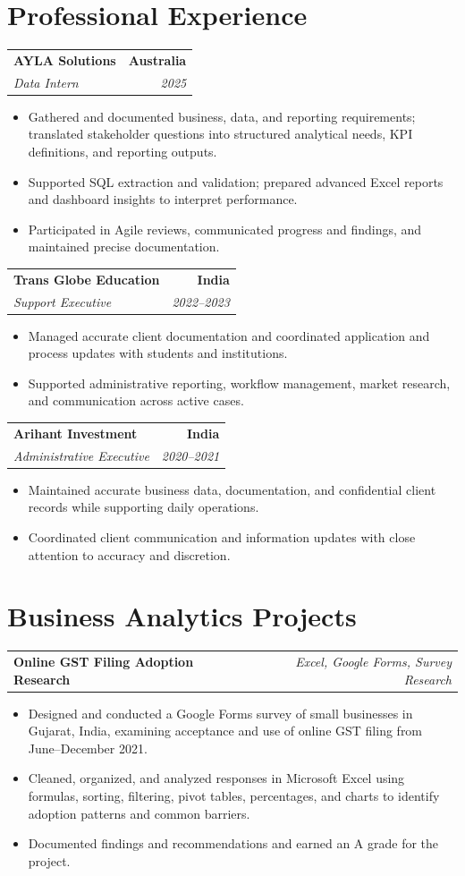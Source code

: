 \documentclass[letterpaper,10pt]{article}
\makeatletter
\newcommand{\role}[4]{%
  \begin{tabularx}{\textwidth}{@{}Xr@{}}
    \textbf{#1} & \textbf{#2} \\
    \textit{#3} & \textit{#4}
  \end{tabularx}\vspace{-1pt}
}
\newcommand{\project}[2]{%
  \begin{tabularx}{\textwidth}{@{}Xr@{}}
    \textbf{#1} & \textit{#2}
  \end{tabularx}\vspace{-1pt}
}
\makeatother
\begin{document}
\section{Professional Experience}
\role{AYLA Solutions}{Australia}{Data Intern}{2025}
\begin{itemize}
  \item Gathered and documented business, data, and reporting requirements; translated stakeholder questions into structured analytical needs, KPI definitions, and reporting outputs.
  \item Supported SQL extraction and validation; prepared advanced Excel reports and dashboard insights to interpret performance.
  \item Participated in Agile reviews, communicated progress and findings, and maintained precise documentation.
\end{itemize}
\vspace{1pt}

\role{Trans Globe Education}{India}{Support Executive}{2022--2023}
\begin{itemize}
  \item Managed accurate client documentation and coordinated application and process updates with students and institutions.
  \item Supported administrative reporting, workflow management, market research, and communication across active cases.
\end{itemize}
\vspace{1pt}

\role{Arihant Investment}{India}{Administrative Executive}{2020--2021}
\begin{itemize}
  \item Maintained accurate business data, documentation, and confidential client records while supporting daily operations.
  \item Coordinated client communication and information updates with close attention to accuracy and discretion.
\end{itemize}

\section{Business Analytics Projects}
\project{Online GST Filing Adoption Research}{Excel, Google Forms, Survey Research}
\begin{itemize}
  \item Designed and conducted a Google Forms survey of small businesses in Gujarat, India, examining acceptance and use of online GST filing from June--December 2021.
  \item Cleaned, organized, and analyzed responses in Microsoft Excel using formulas, sorting, filtering, pivot tables, percentages, and charts to identify adoption patterns and common barriers.
  \item Documented findings and recommendations and earned an A grade for the project.
\end{itemize}
\vspace{1pt}
\end{document}

